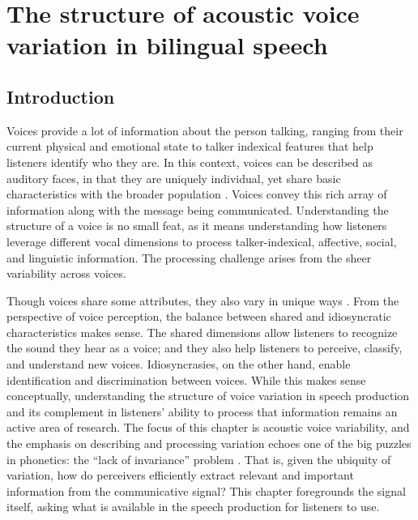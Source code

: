 
\chapter{The structure of acoustic voice variation in bilingual speech}
\label{ch3:Voice}



\section{Introduction}\label{ch3:sec:introduction}
Voices provide a lot of information about the person talking, ranging from their current physical and emotional state to talker indexical features that help listeners identify who they are. In this context, voices can be described as auditory faces, in that they are uniquely individual, yet share basic characteristics with the broader population \citep{belin_2004_voice}. Voices convey this rich array of information along with the message being communicated. Understanding the structure of a voice is no small feat, as it means understanding how listeners leverage different vocal dimensions to process talker-indexical, affective, social, and linguistic information. The processing challenge arises from the sheer variability across voices. 

Though voices share some attributes, they also vary in unique ways \citep{lee_2019_acoustic}. From the perspective of voice perception, the balance between shared and idiosyncratic characteristics makes sense. The shared dimensions allow listeners to recognize the sound they hear as a voice; and they also help listeners to perceive, classify, and understand new voices. Idiosyncrasies, on the other hand, enable identification and discrimination between voices. While this makes sense conceptually, understanding the structure of voice variation in speech production and its complement in listeners' ability to process that information remains an active area of research. The focus of this chapter is acoustic voice variability, and the emphasis on describing and processing variation echoes one of the big puzzles in phonetics: the ``lack of invariance'' problem \citep{liberman_1967_perception}. That is, given the ubiquity of variation, how do perceivers efficiently extract relevant and important information from the communicative signal? This chapter foregrounds the signal itself, asking what is available in the speech production for listeners to use. 

